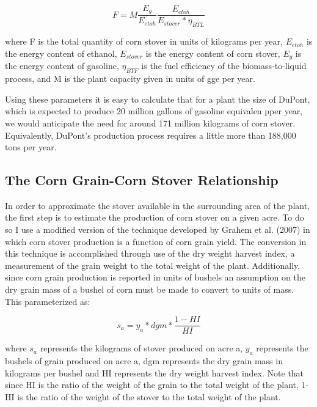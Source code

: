 \documentclass[12pt]{article}\usepackage[]{graphicx}\usepackage[]{color}
\begin{document}
\begin{equation} \tag{1}
F = M \frac{E_{g}}{E_{etoh}} \frac{E_{etoh}}{E_{stover}*\eta_{BTL}}
\end{equation}

where F is the total quantity of corn stover in units of kilograms per year, $E_{etoh}$ is the energy content of ethanol, $E_{stover}$ is the energy content of corn stover, $E_g$ is the energy content of gasoline, $\eta_{BTF}$ is the fuel efficiency of the biomass-to-liquid process, and M is the plant capacity given in units of gge per year.

Using these parameters it is easy to calculate that for a plant the size of DuPont, which is expected to produce 20 million gallons of gasoline equivalen pper year, we would anticipate the need for around 171 million kilograms of corn stover.  Equivalently, DuPont's production process requires a little more than 188,000 tons per year.

\subsection{The Corn Grain-Corn Stover Relationship}

In order to approximate the stover available in the surrounding area of the plant, the first step is to estimate the production of corn stover on a given acre.  To do so I use a modified version of the technique developed by Grahem et al. (2007) \cite{Graham et al} in which corn stover production is a function of corn grain yield.  The conversion in this technique is accomplished through use of the dry weight harvest index, a measurement of the grain weight to the total weight of the plant.  Additionally, since corn grain production is reported in units of bushels an assumption on the dry grain mass of a bushel of corn must be made to convert to units of mass.  This parameterized as:

\begin{equation} \tag{2}
s_a = y_a * dgm * \frac{1-HI}{HI}
\end{equation}

where $s_a$ represents the kilograms of stover produced on acre a, $y_a$ represents the bushels of grain produced on acre a, dgm represents the dry grain mass in kilograms per bushel and HI represents the dry weight harvest index.  Note that since HI is the ratio of the weight of the grain to the total weight of the plant, 1-HI is the ratio of the weight of the stover to the total weight of the plant.
\end{document}
